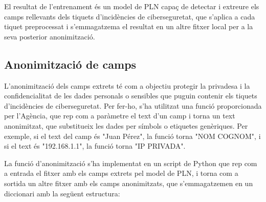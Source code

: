 El resultat de l'entrenament és un model de PLN capaç de detectar i extreure els camps rellevants dels tiquets d'incidències de ciberseguretat, que s'aplica a cada tiquet preprocessat i s'emmagatzema el resultat en un altre fitxer local per a la seva posterior anonimització.

\subsection{Anonimització de camps}

L'anonimització dels camps extrets té com a objectiu protegir la privadesa i la confidencialitat de les dades personals o sensibles que puguin contenir els tiquets d'incidències de ciberseguretat. Per fer-ho, s'ha utilitzat una funció proporcionada per l'Agència, que rep com a paràmetre el text d'un camp i torna un text anonimitzat, que substitueix les dades per símbols o etiquetes genèriques. Per exemple, si el text del camp és "Juan Pérez", la funció torna "NOM COGNOM", i si el text és "192.168.1.1", la funció torna "IP PRIVADA".

La funció d'anonimització s'ha implementat en un script de Python que rep com a entrada el fitxer amb els camps extrets pel model de PLN, i torna com a sortida un altre fitxer amb els camps anonimitzats, que s'emmagatzemen en un diccionari amb la següent estructura:
